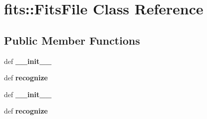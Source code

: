\section{fits::Fits\-File Class Reference}
\label{classfits_1_1FitsFile}
\subsection*{Public Member Functions}
\begin{CompactItemize}
\item 
def \textbf{\_\-\_\-init\_\-\_\-}\label{classfits_1_1FitsFile_f10d042c1d8cb790fe14b2f7033f3c4f}

\item 
def \textbf{recognize}\label{classfits_1_1FitsFile_c01536aa6ed7242941a9269a18c59f51}

\item 
def \textbf{\_\-\_\-init\_\-\_\-}\label{classfits_1_1FitsFile_f10d042c1d8cb790fe14b2f7033f3c4f}

\item 
def \textbf{recognize}\label{classfits_1_1FitsFile_c01536aa6ed7242941a9269a18c59f51}

\end{CompactItemize}
